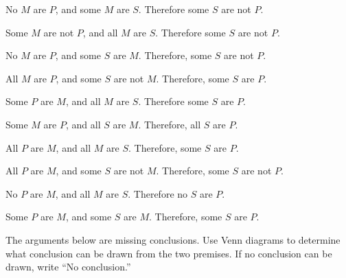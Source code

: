 \begin{exercises}

\item No $M$ are $P$, and some $M$ are $S$. Therefore some $S$ are not $P$.

\item Some $M$ are not $P$, and all $M$ are $S$. Therefore some $S$ are not $P$.

\item   No $M$ are $P$, and some $S$ are $M$. Therefore, some $S$ are not $P$.

\item All $M$ are $P$, and some $S$ are not $M$. Therefore, some $S$ are $P$.

\item Some $P$ are $M$, and all $M$ are $S$. Therefore some $S$ are $P$.

\item Some $M$ are $P$, and all $S$ are $M$. Therefore, all $S$ are $P$.

\item All $P$ are $M$, and all $M$ are $S$. Therefore, some $S$ are $P$.

 \item  All $P$ are $M$, and some $S$ are not $M$. Therefore, some $S$ are not $P$.

\item No $P$ are $M$, and all $M$ are $S$. Therefore no $S$ are $P$.

\item Some $P$ are $M$, and some $S$ are $M$. Therefore, some $S$ are $P$.
 \end{exercises}

\noindent\problempart The arguments below are missing conclusions. Use Venn diagrams to determine what conclusion can be drawn from the two premises. If no conclusion can be drawn, write ``No conclusion.'' \label{no_conclusion_set1}

